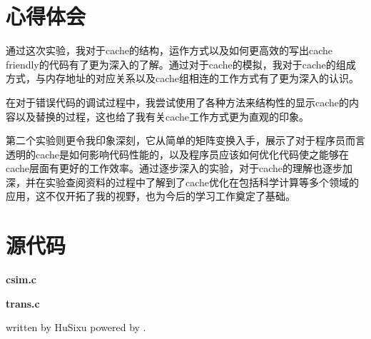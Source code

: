 \documentclass{report}
\begin{document}






\chapter*{心得体会}
\label{cha:xin_de_ti_hui_}

\par 通过这次实验，我对于cache的结构，运作方式以及如何更高效的写出cache friendly的代码有了更为深入的了解。通过对于cache的模拟，我对于cache的组成方式，与内存地址的对应关系以及cache组相连的工作方式有了更为深入的认识。
\par 在对于错误代码的调试过程中，我尝试使用了各种方法来结构性的显示cache的内容以及替换的过程，这也给了我有关cache工作方式更为直观的印象。
\par 第二个实验则更令我印象深刻，它从简单的矩阵变换入手，展示了对于程序员而言透明的cache是如何影响代码性能的，以及程序员应该如何优化代码使之能够在cache层面有更好的工作效率。通过逐步深入的实验，对于cache的理解也逐步加深，并在实验查阅资料的过程中了解到了cache优化在包括科学计算等多个领域的应用，这不仅开拓了我的视野，也为今后的学习工作奠定了基础。

{\let\clearpage\relax \chapter*{源代码}}
\label{cha:yuan_dai_ma_}

\noindent \textbf{csim.c}


\noindent \textbf{trans.c}


\vfill
{\tiny written by HuSixu \hfill powered by \XeLaTeX .}
\end{document}
